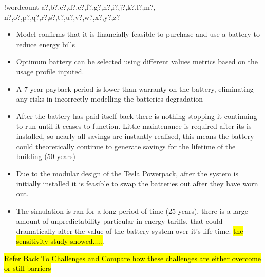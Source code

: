 \documentclass[fontsize=9.5pt]{extarticle}
\numberwithin{figure}{section} %
\providecommand{\tightlist}{%
  \setlength{\itemsep}{0pt}\setlength{\parskip}{0pt}}
\newcounter{words}
\newenvironment{counted}{%
  \setcounter{words}{0}
  \SearchList!{wordcount}{\stepcounter{words}}
    {a?,b?,c?,d?,e?,f?,g?,h?,i?,j?,k?,l?,m?,
    n?,o?,p?,q?,r?,s?,t?,u?,v?,w?,x?,y?,z?}
  \UndoBoundary{'}
  \SearchOrder{p;}}{%
  \StopSearching}
\begin{document}
\begin{counted}
\begin{itemize}
\tightlist
\item
  Model confirms that it is financially feasible to purchase and use a
  battery to reduce energy bills
\item
  Optimum battery can be selected using different values metrics based
  on the usage profile inputed.
\item
  A 7 year payback period is lower than warranty on the battery,
  eliminating any risks in incorrectly modelling the batteries
  degradation
\item
  After the battery has paid itself back there is nothing stopping it
  continuing to run until it ceases to function. Little maintenance is
  required after its is installed, so nearly all savings are instantly
  realised, this means the battery could theoretically continue to
  generate savings for the lifetime of the building (50 years)
\item
  Due to the modular design of the Tesla Powerpack, after the system is
  initially installed it is feasible to swap the batteries out after
  they have worn out.
\item
  The simulation is ran for a long period of time (25 years), there is a
  large amount of unpredictability particular in energy tariffs, that
  could dramatically alter the value of the battery system over it's
  life time. \hl{the sensitivity study showed.....}.
\end{itemize}

\hl{Refer Back To Challenges and Compare how these challenges are either overcome or still barriers}


\end{counted}
\end{document}
